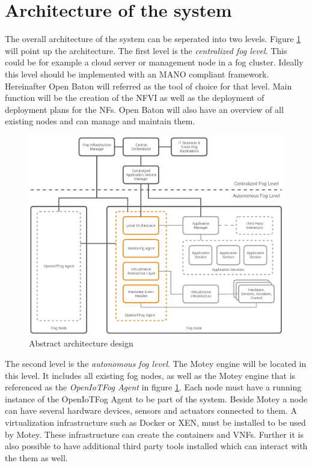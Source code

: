 \section{Architecture of the system}
The overall architecture of the system can be seperated into two levels.
Figure \ref{fig:abstract_architecture_design} will point up the architecture.
The first level is the \textit{centralized fog level}.
This could be for example a cloud server or management node in a fog cluster.
Ideally this level should be implemented with an \ac{MANO} compliant framework.
Hereinafter Open Baton will referred as the tool of choice for that level.
Main function will be the creation of the \ac{NFVI} as well as the deployment of deployment plans for the \acp{NF}.
Open Baton will also have an overview of all existing nodes and can manage and maintain them.

\begin{figure}[H]
    \centering
    \includegraphics[width=\textwidth]{resources/images/initial_structure.png}
    \caption[Abstract architecture design]{Abstract architecture design}
    \label{fig:abstract_architecture_design}
\end{figure}

The second level is the \textit{autonomous fog level}.
The Motey engine will be located in this level.
It includes all existing fog nodes, as well as the Motey engine that is referenced as the \textit{OpenIoTFog Agent} in figure \ref{fig:abstract_architecture_design}.
Each node must have a running instance of the OpenIoTFog Agent to be part of the system.
Beside Motey a node can have several hardware devices, sensors and actuators connected to them.
A virtualization infrastructure such as Docker or XEN, must be installed to be used by Motey.
These infrastructure can create the containers and \acp{VNF}.
Further it is also possible to have additional third party tools installed which can interact with the them as well.

